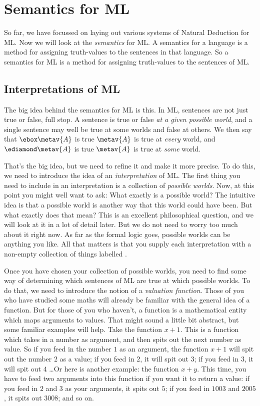\chapter{Semantics for ML}
\label{Semantics}

So far, we have focussed on laying out various systems of Natural Deduction for ML. Now we will look at the \emph{semantics} for ML. A semantics for a language is a method for assigning truth-values to the sentences in that language. So a semantics for ML is a method for assigning truth-values to the sentences of ML.

\section{Interpretations of ML}

The big idea behind the semantics for ML is this. In ML, sentences are not just true or false, full stop. A sentence is true or false \emph{at a given possible world}, and a single sentence may well be true at some worlds and false at others. We then say that $\ebox \metav{A}$ is true \ifeff{} $\metav{A}$ is true at \emph{every} world, and $\ediamond\metav{A}$ is true \ifeff{} $\metav{A}$ is true at \emph{some} world.

That's the big idea, but we need to refine it and make it more precise. To do this, we need to introduce the idea of an \emph{interpretation} of ML. The first thing you need to include in an interpretation is a collection of \emph{possible worlds}. Now, at this point you might well want to ask: What exactly is a possible world? The intuitive idea is that a possible world is another way that this world could have been. But what exactly does that mean? This is an excellent philosophical question, and we will look at it in a lot of detail later. But we do not need to worry too much about it right now. As far as the formal logic goes, possible worlds can be anything you like. All that matters is that you supply each interpretation with a non-empty collection of things labelled .

Once you have chosen your collection of possible worlds, you need to find some way of determining which sentences of ML are true at which possible worlds. To do that, we need to introduce the notion of a \emph{valuation function}. Those of you who have studied some maths will already be familiar with the general idea of a function. But for those of you who haven't, a function is a mathematical entity which maps arguments to values. That might sound a little bit abstract, but some familiar examples will help. Take the function $x+1$. This is a function which takes in a number as argument, and then spits out the next number as value. So if you feed in the number $1$ as an argument, the function $x+1$ will spit out the number $2$ as a value; if you feed in $2$, it will spit out $3$; if you feed in $3$, it will spit out $4$ \dots  Or here is another example: the function $x+y$. This time, you have to feed two arguments into this function if you want it to return a value: if you feed in $2$ and $3$ as your arguments, it spits out $5$; if you feed in $1003$ and $2005$, it spits out $3008$; and so on.

